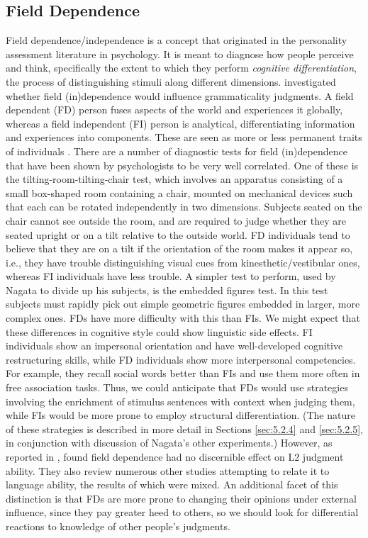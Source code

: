 \subsection{Field Dependence} \label{sec:4.3.1}

Field dependence/independence is a concept that originated in the personality assessment literature in psychology. It is meant to diagnose how people perceive and think, specifically the extent to which they perform \textit{cognitive differentiation}, the process of distinguishing stimuli along different dimensions. \citet{Nagata1989b} investigated whether field (in)dependence would influence grammaticality judgments. A field dependent (FD) person fuses aspects of the world and experiences it globally, whereas a field independent (FI) person is analytical, differentiating information and experiences into components. These are seen as more or less permanent traits of individuals \citep{WeinerEtAl1977}. There are a number of diagnostic tests for field (in)dependence that have been shown by psychologists to be very well correlated. One of these is the tilting-room-tilting-chair test, which involves an apparatus consisting of a small box-shaped room containing a chair, mounted on mechanical devices such that each can be rotated independently in two dimensions. Subjects seated on the chair cannot see outside the room, and are required to judge whether they are seated upright or on a tilt relative to the outside world. FD individuals tend to believe that they are on a tilt if the orientation of the room makes it appear so, i.e., they have trouble distinguishing visual cues from kinesthetic/vestibular ones, whereas FI individuals have less trouble. A simpler test to perform, used by Nagata to divide up his subjects, is the embedded figures test. In this test subjects must rapidly pick out simple geometric figures embedded in larger, more complex ones. FDs have more difficulty with this than FIs. We might expect that these differences in cognitive style could show linguistic side effects. FI individuals show an impersonal orientation and have well-developed cognitive restructuring skills, while FD individuals show more interpersonal competencies. For
example, they recall social words better than FIs and use them more often in free association tasks. Thus, we could anticipate that FDs would use strategies involving the enrichment of stimulus sentences with context when judging them, while FIs would be more prone to employ structural differentiation. (The nature of these strategies is described in more detail in Sections \ref{sec:5.2.4} and \ref{sec:5.2.5},
in conjunction with discussion of Nagata's other experiments.) However, as reported in , \citet{MasnyEtAl1985} found field dependence had no discernible effect on L2 judgment ability. They also review numerous other studies attempting to relate it to language ability, the results of which were mixed. An additional facet of this distinction is that FDs are more prone to changing their opinions under external influence, since they pay greater heed to others, so we should look for differential reactions to knowledge of other people's judgments.

